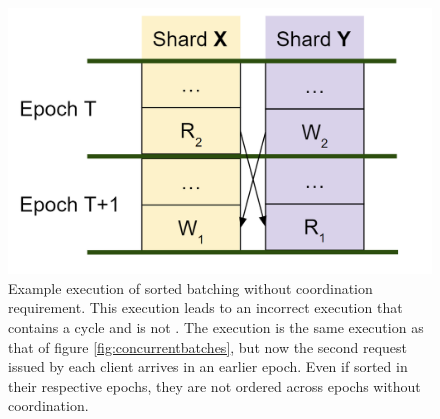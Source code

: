 
\begin{figure}[!htb]
\includegraphics[scale=.3]{sorted_batching_wrong.png}
\caption{Example execution of sorted batching without coordination requirement. This execution leads to an incorrect execution that contains a cycle and is not \mdl. The execution is the same execution as that of figure \ref{fig:concurrentbatches}, but now the second request issued by each client arrives in an earlier epoch. Even if sorted in their respective epochs, they are not ordered across epochs without coordination.}
\label{fig:sortedbatchingwrong}
\end{figure}


